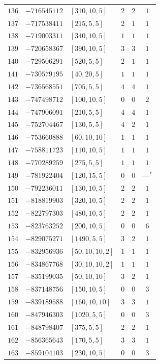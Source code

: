 \documentclass[11pt]{article}
\begin{document}
\begin{center}
\begin{longtable}{r r l c c c}
$136$ & $-716545112$ & $[310,10,5]$ & $2$ & $2$ & $1$\\
$137$ & $-717538411$ & $[215,5,5]$ & $2$ & $1$ & $1$\\
$138$ & $-719003311$ & $[340,10,5]$ & $1$ & $1$ & $1$\\
$139$ & $-720658367$ & $[390,10,5]$ & $3$ & $3$ & $1$\\
$140$ & $-729506291$ & $[520,5,5]$ & $2$ & $1$ & $1$\\
$141$ & $-730579195$ & $[40,20,5]$ & $1$ & $1$ & $1$\\
$142$ & $-736568551$ & $[705,5,5]$ & $4$ & $4$ & $1$\\
$143$ & $-747498712$ & $[100,10,5]$ & $0$ & $0$ & $2$\\
$144$ & $-747906091$ & $[210,5,5]$ & $4$ & $4$ & $1$\\
$145$ & $-752704467$ & $[130,5,5]$ & $4$ & $2$ & $1$\\
$146$ & $-753660888$ & $[60,10,10]$ & $1$ & $1$ & $1$\\
$147$ & $-758811723$ & $[110,10,5]$ & $1$ & $1$ & $1$\\
$148$ & $-770289259$ & $[275,5,5]$ & $1$ & $1$ & $1$\\
$149$ & $-781922404$ & $[120,15,5]$ & $0$ & $0$ & ---${}^{*}$\\
$150$ & $-792236011$ & $[130,10,5]$ & $2$ & $2$ & $1$\\
$151$ & $-818819903$ & $[320,10,5]$ & $2$ & $2$ & $1$\\
$152$ & $-822797303$ & $[480,10,5]$ & $2$ & $2$ & $1$\\
$153$ & $-823763252$ & $[200,10,5]$ & $0$ & $0$ & $6$\\
$154$ & $-829075271$ & $[1490,5,5]$ & $3$ & $2$ & $1$\\
$155$ & $-832956936$ & $[50,10,10,2]$ & $1$ & $1$ & $1$\\
$156$ & $-834867768$ & $[30,10,10,2]$ & $1$ & $1$ & $1$\\
$157$ & $-835199035$ & $[50,10,10]$ & $3$ & $2$ & $1$\\
$158$ & $-837148756$ & $[150,10,5]$ & $0$ & $0$ & $3$\\
$159$ & $-839189588$ & $[160,10,10]$ & $3$ & $3$ & $1$\\
$160$ & $-847946303$ & $[1020,5,5]$ & $0$ & $0$ & $3$\\
$161$ & $-848798407$ & $[375,5,5]$ & $2$ & $2$ & $1$\\
$162$ & $-856365643$ & $[170,5,5]$ & $3$ & $3$ & $1$\\
$163$ & $-859104103$ & $[230,10,5]$ & $0$ & $0$ & $3$\\

\end{longtable}
\end{center}
\end{document}
